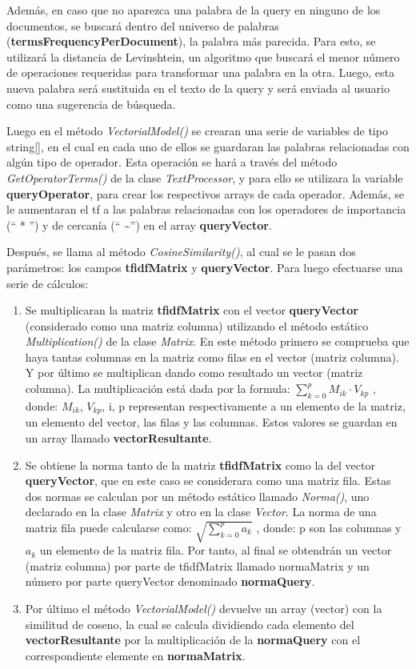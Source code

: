 \documentclass[a4paper,12pt]{report}
\begin{document}
Además, en caso que no aparezca una palabra de la query en ninguno de los documentos, se buscará
dentro del universo de palabras (\textbf{termsFrequencyPerDocument}), la palabra más parecida. Para esto,
se utilizará la distancia de Levinshtein, un algoritmo que buscará el menor número de operaciones
requeridas para transformar una palabra en la otra. Luego, esta nueva palabra será sustituida en el
texto de la query y será enviada al usuario como una sugerencia de búsqueda.

\newpage

Luego en el método \textit{VectorialModel()} se crearan una serie de variables de tipo string[], en el cual en
cada uno de ellos se guardaran las palabras relacionadas con algún tipo de operador. Esta operación
se hará a través del método \textit{GetOperatorTerms()} de la clase \textit{TextProcessor}, y para ello se utilizara la
variable \textbf{queryOperator}, para crear los respectivos arrays de cada operador. Además, se le
aumentaran el tf a las palabras relacionadas con los operadores de importancia (“ * ”) y de cercanía
(“ \textasciitilde \space ”) en el array \textbf{queryVector}.

Después, se llama al método \textit{CosineSimilarity()}, al cual se le pasan dos parámetros: los campos
\textbf{tfidfMatrix} y \textbf{queryVector}. Para luego efectuarse una serie de cálculos:

\begin{enumerate}
    \item Se multiplicaran la matriz \textbf{tfidfMatrix} con el vector \textbf{queryVector} (considerado como una matriz
    columna) utilizando el método estático \textit{Multiplication()} de la clase \textit{Matrix}. En este método
    primero se comprueba que haya tantas columnas en la matriz como filas en el vector (matriz
    columna). Y por último se multiplican dando como resultado un vector (matriz columna). La
    multiplicación está dada por la formula: $\sum_{k = 0}^{p} M_{ik} \cdot V_{kp}$ , donde: $M_{ik}$, $V_{kp}$, i, p
    representan respectivamente a un elemento de la matriz, un elemento del vector, las filas y
    las columnas. Estos valores se guardan en un array llamado \textbf{vectorResultante}.
    \item Se obtiene la norma tanto de la matriz \textbf{tfidfMatrix} como la del vector \textbf{queryVector}, que en este
    caso se considerara como una matriz fila. Estas dos normas se calculan por un método estático
    llamado \textit{Norma()}, uno declarado en la clase \textit{Matrix} y otro en la clase \textit{Vector}. La norma de una
    matriz fila puede calcularse como: $\sqrt{\sum_{k = 0}^{p} a_k}$ , donde: p son las columnas y $a_k$ un elemento de la matriz fila. Por tanto, al final se obtendrán un vector (matriz columna) por parte de
    tfidfMatrix llamado normaMatrix y un número por parte queryVector denominado \textbf{normaQuery}.
    \item Por último el método \textit{VectorialModel()} devuelve un array (vector) con la similitud de coseno,
    la cual se calcula dividiendo cada elemento del \textbf{vectorResultante} por la multiplicación de la
    \textbf{normaQuery} con el correspondiente elemente en \textbf{normaMatrix}. 
\end{enumerate}
\end{document}
